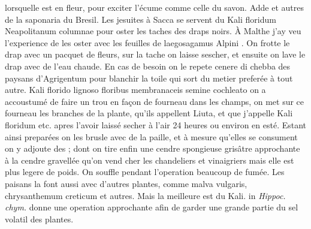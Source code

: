 lorsquelle est en fleur, pour exciter l'\'{e}cume comme celle du savon.
%
Adde 
%
et autres de la saponaria\protect{} du Bresil\protect{}.
Les jesuites \`{a} Sacca\protect{} se servent du Kali floridum Neapolitanum columnae\protect{} pour oster les taches des draps noirs. 
À Malthe\protect{} j'ay veu l'experience de les oster avec les feuilles de laegosagamus Alpini\protect{} .
On frotte le drap avec un pacquet de fleurs, sur la tache on laisse sescher, et ensuite on lave le drap avec de l'eau chaude. En cas de besoin on le repete cenere di chebba\protect{}  des paysans d'Agrigentum\protect{} pour blanchir la toile qui sort du metier prefer\'{e}e \`{a} tout autre.
 Kali florido\protect{} lignoso floribus membranaceis semine cochleato \protect{} on a accoustum\'{e} de faire un trou en fa\c{c}on de fourneau dans les champs, on met sur ce fourneau les branches de la plante, qu'ils appellent Liuta\protect{}, et que j'appelle Kali floridum etc. apres l'avoir laiss\'{e} secher \`{a} l'air 24 heures ou environ en est\'{e}. Estant ainsi prepar\'{e}es on les brusle avec de la paille, et \`{a} mesure qu'elles se consument on y adjoute des ; dont on tire enfin une cendre spongieuse gris\^{a}tre approchante \`{a} la cendre gravell\'{e}e qu'on vend cher les chandeliers et vinaigriers mais elle est plus legere de poids. On souffle pendant l'operation beaucoup de fum\'{e}e. Les paisans la font aussi avec d'autres plantes, comme malva vulgaris\protect{}, chrysanthemum creticum\protect{} et autres.
Mais la meilleure est du Kali.\protect{}
 in \textit{Hippoc. chym.}
%
donne une operation approchante afin de garder une grande partie du sel volatil\protect{} des plantes.
\pend%
\count{}
\count{}
\count{}